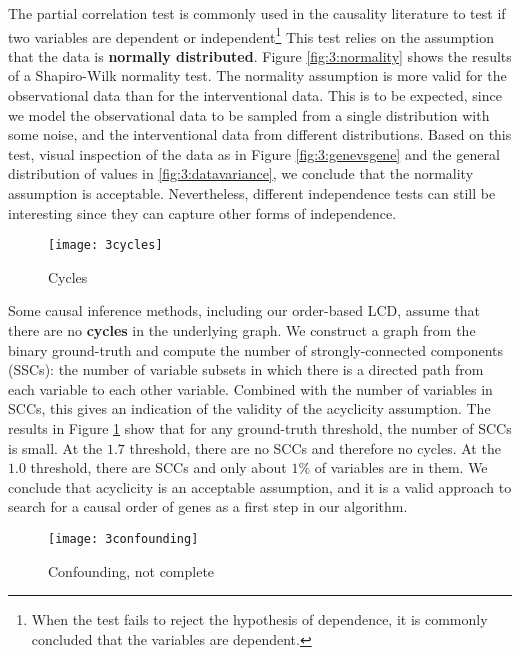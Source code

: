The partial correlation test is commonly used in the causality literature to test if two variables are dependent or independent\footnote{When the test fails to reject the hypothesis of dependence, it is commonly concluded that the variables are dependent.} This test relies on the assumption that the data is \textbf{normally distributed}. Figure \ref{fig:3:normality} shows the results of a Shapiro-Wilk normality test. The normality assumption is more valid for the observational data than for the interventional data. This is to be expected, since we model the observational data to be sampled from a single distribution with some noise, and the interventional data from different distributions. Based on this test, visual inspection of the data as in Figure \ref{fig:3:genevsgene} and the general distribution of values in \ref{fig:3:datavariance}, we conclude that the normality assumption is acceptable. Nevertheless, different independence tests can still be interesting since they can capture other forms of independence. 

\begin{figure}[h]
    \centering
    \texttt{[image: 3cycles]}
    \caption{Cycles}
    \label{fig:3:cycles}
\end{figure}    

Some causal inference methods, including our order-based LCD, assume that there are no \textbf{cycles} in the underlying graph. We construct a graph from the binary ground-truth and compute the number of strongly-connected components (SSCs): the number of variable subsets in which there is a directed path from each variable to each other variable. Combined with the number of variables in SCCs, this gives an indication of the validity of the acyclicity assumption. The results in Figure \ref{fig:3:cycles} show that for any ground-truth threshold, the number of SCCs is small. At the $1.7$ threshold, there are no SCCs and therefore no cycles. At the $1.0$ threshold, there are SCCs and only about $1\%$ of variables are in them. We conclude that acyclicity is an acceptable assumption, and it is a valid approach to search for a causal order of genes as a first step in our algorithm.

\begin{figure}[h]
    \centering
    \texttt{[image: 3confounding]}
    \caption{Confounding, not complete}
    \label{fig:3:confounding}
\end{figure}    

